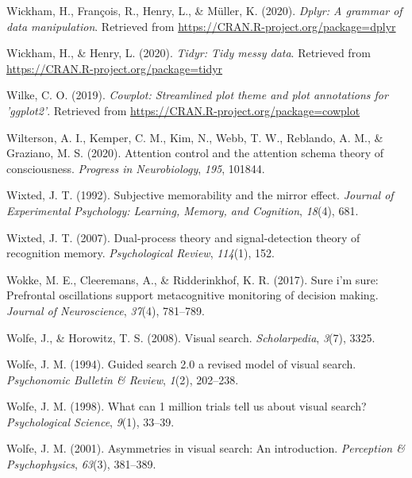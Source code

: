 \documentclass[12pt,twoside]{reedthesis}
\newenvironment{CSLReferences}%
  {}%
  {\par}
\begin{document}
\begin{CSLReferences}{1}{0}
\leavevmode\hypertarget{ref-R-dplyr}{}%
Wickham, H., François, R., Henry, L., \& Müller, K. (2020). \emph{Dplyr: A grammar of data manipulation}. Retrieved from \url{https://CRAN.R-project.org/package=dplyr}

\leavevmode\hypertarget{ref-R-tidyr}{}%
Wickham, H., \& Henry, L. (2020). \emph{Tidyr: Tidy messy data}. Retrieved from \url{https://CRAN.R-project.org/package=tidyr}

\leavevmode\hypertarget{ref-R-cowplot}{}%
Wilke, C. O. (2019). \emph{Cowplot: Streamlined plot theme and plot annotations for 'ggplot2'}. Retrieved from \url{https://CRAN.R-project.org/package=cowplot}

\leavevmode\hypertarget{ref-wilterson2020attention}{}%
Wilterson, A. I., Kemper, C. M., Kim, N., Webb, T. W., Reblando, A. M., \& Graziano, M. S. (2020). Attention control and the attention schema theory of consciousness. \emph{Progress in Neurobiology}, \emph{195}, 101844.

\leavevmode\hypertarget{ref-wixted1992subjective}{}%
Wixted, J. T. (1992). Subjective memorability and the mirror effect. \emph{Journal of Experimental Psychology: Learning, Memory, and Cognition}, \emph{18}(4), 681.

\leavevmode\hypertarget{ref-wixted2007dual}{}%
Wixted, J. T. (2007). Dual-process theory and signal-detection theory of recognition memory. \emph{Psychological Review}, \emph{114}(1), 152.

\leavevmode\hypertarget{ref-wokke2017sure}{}%
Wokke, M. E., Cleeremans, A., \& Ridderinkhof, K. R. (2017). Sure i'm sure: Prefrontal oscillations support metacognitive monitoring of decision making. \emph{Journal of Neuroscience}, \emph{37}(4), 781--789.

\leavevmode\hypertarget{ref-wolfe2008visual}{}%
Wolfe, J., \& Horowitz, T. S. (2008). Visual search. \emph{Scholarpedia}, \emph{3}(7), 3325.

\leavevmode\hypertarget{ref-wolfe1994guided}{}%
Wolfe, J. M. (1994). Guided search 2.0 a revised model of visual search. \emph{Psychonomic Bulletin \& Review}, \emph{1}(2), 202--238.

\leavevmode\hypertarget{ref-wolfe1998can}{}%
Wolfe, J. M. (1998). What can 1 million trials tell us about visual search? \emph{Psychological Science}, \emph{9}(1), 33--39.

\leavevmode\hypertarget{ref-wolfe2001asymmetries}{}%
Wolfe, J. M. (2001). Asymmetries in visual search: An introduction. \emph{Perception \& Psychophysics}, \emph{63}(3), 381--389.


\end{CSLReferences}
\end{document}
